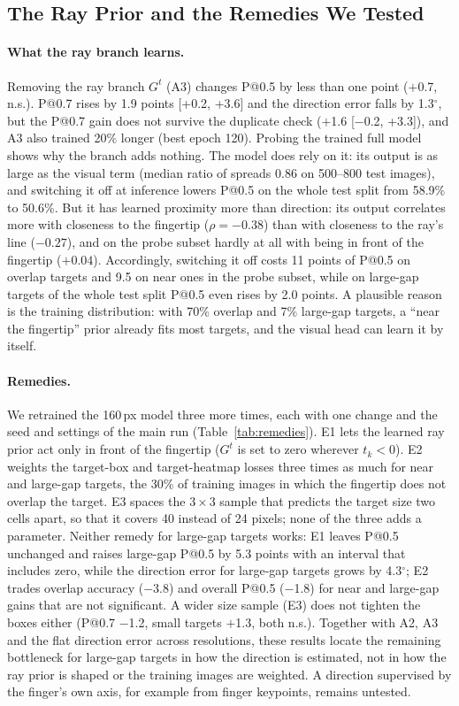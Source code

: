 \subsection{The Ray Prior and the Remedies We Tested}\label{app:ray}

\paragraph{What the ray branch learns.} Removing the ray branch $G^t$ (A3) changes P@0.5 by less than one point ($+$0.7, n.s.). P@0.7 rises by 1.9 points [+0.2, +3.6] and the direction error falls by 1.3$^\circ$, but the P@0.7 gain does not survive the duplicate check ($+$1.6 [$-$0.2, +3.3]), and A3 also trained 20\% longer (best epoch 120). Probing the trained full model shows why the branch adds nothing. The model does rely on it: its output is as large as the visual term (median ratio of spreads 0.86 on 500--800 test images), and switching it off at inference lowers P@0.5 on the whole test split from 58.9\% to 50.6\%. But it has learned proximity more than direction: its output correlates more with closeness to the fingertip ($\rho=-0.38$) than with closeness to the ray's line ($-0.27$), and on the probe subset hardly at all with being in front of the fingertip ($+0.04$). Accordingly, switching it off costs 11 points of P@0.5 on overlap targets and 9.5 on near ones in the probe subset, while on large-gap targets of the whole test split P@0.5 even rises by 2.0 points. A plausible reason is the training distribution: with 70\% overlap and 7\% large-gap targets, a ``near the fingertip'' prior already fits most targets, and the visual head can learn it by itself.

\paragraph{Remedies.} We retrained the 160\,px model three more times, each with one change and the seed and settings of the main run (Table~\ref{tab:remedies}). E1 lets the learned ray prior act only in front of the fingertip ($G^t$ is set to zero wherever $t_k<0$). E2 weights the target-box and target-heatmap losses three times as much for near and large-gap targets, the 30\% of training images in which the fingertip does not overlap the target. E3 spaces the $3\times3$ sample that predicts the target size two cells apart, so that it covers 40 instead of 24 pixels; none of the three adds a parameter. Neither remedy for large-gap targets works: E1 leaves P@0.5 unchanged and raises large-gap P@0.5 by 5.3 points with an interval that includes zero, while the direction error for large-gap targets grows by 4.3$^\circ$; E2 trades overlap accuracy ($-$3.8) and overall P@0.5 ($-$1.8) for near and large-gap gains that are not significant. A wider size sample (E3) does not tighten the boxes either (P@0.7 $-$1.2, small targets $+$1.3, both n.s.). Together with A2, A3 and the flat direction error across resolutions, these results locate the remaining bottleneck for large-gap targets in how the direction is estimated, not in how the ray prior is shaped or the training images are weighted. A direction supervised by the finger's own axis, for example from finger keypoints, remains untested.

